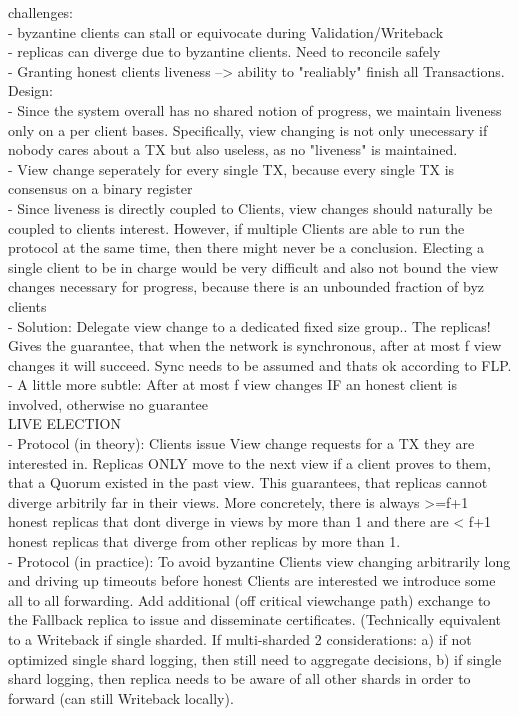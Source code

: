 challenges:\\
- byzantine clients can stall or equivocate during Validation/Writeback\\
- replicas can diverge due to byzantine clients. Need to reconcile safely\\
- Granting honest clients liveness --> ability to "realiably" finish all Transactions.\\


Design: \\
- Since the system overall has no shared notion of progress, we maintain liveness only on a per client bases. Specifically, view changing is not only unecessary if nobody cares about a TX but also useless, as no "liveness" is maintained.\\
- View change seperately for every single TX, because every single TX is consensus on a binary register\\
- Since liveness is directly coupled to Clients, view changes should naturally be coupled to clients interest. However, if multiple Clients are able to run the protocol at the same time, then there might never be a conclusion. Electing a single client to be in charge would be very difficult and also not bound the view changes necessary for progress, because there is an unbounded fraction of byz clients\\
- Solution: Delegate view change to a dedicated fixed size group.. The replicas! Gives the guarantee, that when the network is synchronous, after at most f view changes it will succeed. Sync needs to be assumed and thats ok according to FLP.\\
- A little more subtle: After at most f view changes IF an honest client is involved, otherwise no guarantee\\

LIVE ELECTION\\
- Protocol (in theory): Clients issue View change requests for a TX they are interested in. Replicas ONLY move to the next view if a client proves to them, that a Quorum existed in the past view. This guarantees, that replicas cannot diverge arbitrily far in their views. More concretely, there is always >=f+1 honest replicas that dont diverge in views by more than 1 and there are < f+1 honest replicas that diverge from other replicas by more than 1.\\


- Protocol (in practice): To avoid byzantine Clients view changing arbitrarily long and driving up timeouts before honest Clients are interested we introduce some all to all forwarding.
Add additional (off critical viewchange path) exchange to the Fallback replica to issue and disseminate certificates. (Technically equivalent to a Writeback if single sharded. If multi-sharded 2 considerations: a) if not optimized single shard logging, then still need to aggregate decisions, b) if single shard logging, then replica needs to be aware of all other shards in order to forward (can still Writeback locally).\\

